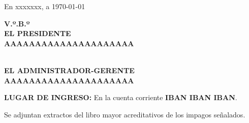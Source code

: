 \documentclass[12pt, a4paper, twoside]{article}
\begin{document}
\begin{center}
    En xxxxxxx, a \today
\end{center}
\begin{multicols}{2}
    \begin{center}
        \textbf{V.º.B.º}\\
        \vspace{10pt}
        \textbf{EL PRESIDENTE}\\
        \vspace{60pt}
        \textbf{\textsc{AAAAAAAAAAAAAAAAAAAAA}}        
    \end{center}

    \columnbreak
    
    \begin{center}
        \textbf{}\\
        \vspace{10pt}
        \textbf{EL ADMINISTRADOR-GERENTE}\\
        \vspace{60pt}
        \textbf{\textsc{AAAAAAAAAAAAAAAAAAAAA}}
    \end{center}
\end{multicols}
\textbf{LUGAR DE INGRESO:} En la cuenta corriente \textbf{IBAN IBAN IBAN}.

Se adjuntan extractos del libro mayor acreditativos de los impagos señalados.
\end{document}
